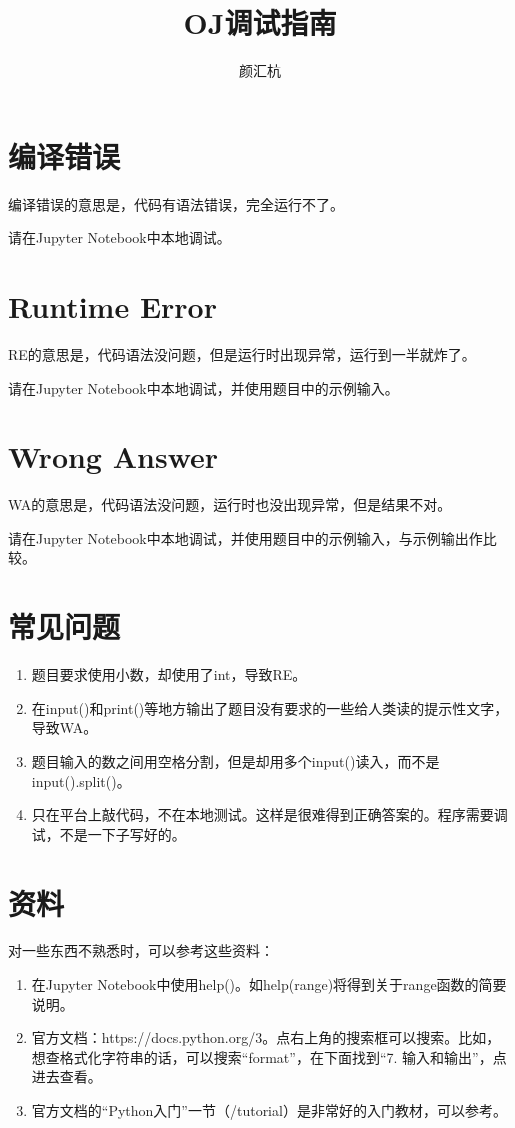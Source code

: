 \documentclass[twocolumn, a5paper]{article}
\title{OJ调试指南}
\author{颜汇杭}
\begin{document}
\maketitle	
\thispagestyle{empty}

\section{编译错误}

编译错误的意思是，代码有语法错误，完全运行不了。

请在Jupyter Notebook中本地调试。

\section{Runtime Error}

RE的意思是，代码语法没问题，但是运行时出现异常，运行到一半就炸了。

请在Jupyter Notebook中本地调试，并使用题目中的示例输入。

\section{Wrong Answer}

WA的意思是，代码语法没问题，运行时也没出现异常，但是结果不对。

请在Jupyter
Notebook中本地调试，并使用题目中的示例输入，与示例输出作比较。

\section{常见问题}

\begin{enumerate}
	\item 题目要求使用小数，却使用了int，导致RE。
	\item
			在input()和print()等地方输出了题目没有要求的一些给人类读的提示性文字，导致WA。
	\item
			题目输入的数之间用空格分割，但是却用多个input()读入，而不是input().split()。
	\item
			只在平台上敲代码，不在本地测试。这样是很难得到正确答案的。程序需要调试，不是一下子写好的。
\end{enumerate}

\section{资料}

对一些东西不熟悉时，可以参考这些资料：

\begin{enumerate}
		\item 在Jupyter
				Notebook中使用help()。如help(range)将得到关于range函数的简要说明。
				\item
						官方文档：https://docs.python.org/3。点右上角的搜索框可以搜索。比如，想查格式化字符串的话，可以搜索“format”，在下面找到“7.
						输入和输出”，点进去查看。
				\item
						官方文档的“Python入门”一节（/tutorial）是非常好的入门教材，可以参考。
\end{enumerate}
\end{document}
